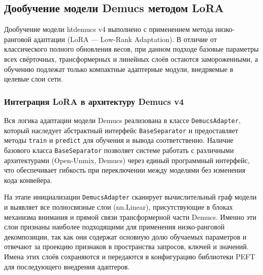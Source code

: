 \documentclass[14pt]{extarticle}
\begin{document}







\subsection{Дообучение модели Demucs методом LoRA}
Дообучение модели htdemucs v4 выполнено с применением метода низко-ранговой адаптации (LoRA — Low-Rank Adaptation). 
В отличие от классического полного обновления весов, при данном подходе базовые параметры всех свёрточных, трансформерных и
линейных слоёв остаются замороженными, а обучению подлежат только компактные адаптерные модули, внедряемые в целевые слои сети.

\subsubsection{Интеграция LoRA в архитектуру Demucs v4}

Вся логика адаптации модели Demucs реализована в классе \texttt{DemucsAdapter}, который наследует абстрактный интерфейс
\texttt{BaseSeparator} и предоставляет методы \texttt{train} и \texttt{predict} для обучения и вывода соответственно.
Наличие базового класса \texttt{BaseSeparator} позволяет системе работать с различными архитектурами (Open-Unmix, Demucs) 
через единый программный интерфейс, что обеспечивает гибкость при переключении между моделями без изменения кода конвейера.

На этапе инициализации \texttt{DemucsAdapter} сканирует вычислительный граф модели и выявляет все полносвязные 
слои (nn.Linear), присутствующие в блоках механизма внимания и прямой связи трансформерной части Demucs.
Именно эти слои признаны наиболее подходящими для применения низко-ранговой декомпозиции, так как они содержат 
основную долю обучаемых параметров и отвечают за проекцию признаков в пространства запросов, ключей и значений.
Имена этих слоёв сохраняются и передаются в конфигурацию библиотеки PEFT для последующего внедрения адаптеров. 
\end{document}
